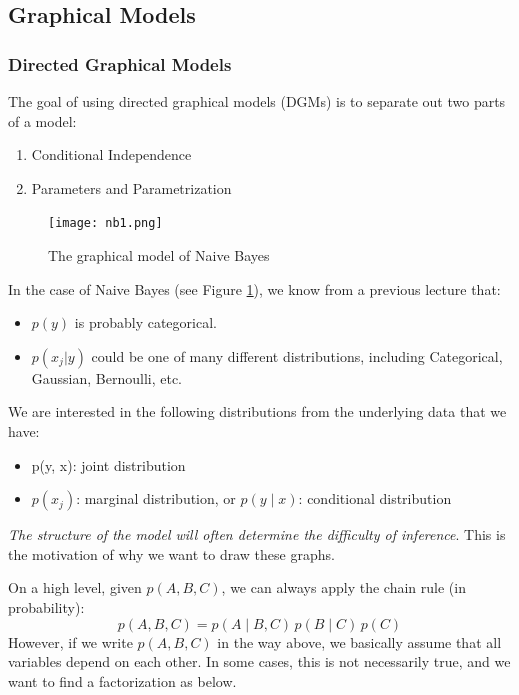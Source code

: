 \documentclass{article}
\begin{document}
\subsection{Graphical Models}
\subsubsection{Directed Graphical Models}

The goal of using directed graphical models (DGMs) is to separate out two parts of a model:
\begin{enumerate}
\item Conditional Independence
\item Parameters and Parametrization
\end{enumerate}

\begin{figure}[!ht]
    \centering
    \texttt{[image: nb1.png]}
    \caption{The graphical model of Naive Bayes}
    \label{fig:nb1}
\end{figure}


\noindent
In the case of Naive Bayes (see Figure \ref{fig:nb1}), we know from a previous lecture that:
\begin{itemize}
\item $p(y)$ is probably categorical.
\item $p(x_{j}|y)$ could be one of many different distributions, including Categorical, Gaussian, Bernoulli, etc.
\end{itemize}
We are interested in the following distributions from the underlying data that we have:
\begin{itemize}
\item p(y, x): joint distribution
\item $p(x_{j})$: marginal distribution, or $p(y \mid x)$: conditional distribution
\end{itemize}



\emph{The structure of the model will often determine the difficulty of inference}. This is the motivation of why we want to draw these graphs.



On a high level,
given $p(A, B, C)$, we can always apply the chain rule (in probability):
\[ 
p(A, B, C) = p(A \mid B, C) \, p(B \mid C) \, p(C) 
\]
However, if we write $p(A, B, C)$ in the way above, we basically assume that all variables depend on each other. In some cases, this is not necessarily true, and we want to find a factorization as below. 
\end{document}
